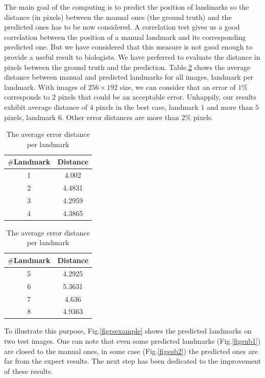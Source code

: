 \documentclass[10pt]{article}
\begin{document}
The main goal of the computing is to predict the position of landmarks so
the distance (in pixels) between the manual ones (the ground truth)
and the predicted ones has to be now considered. A correlation test
gives us a good correlation between the position of a manual landmark and
its corresponding predicted one. But we have considered that this
measure is not good enough to provide a useful result to biologists. We
have preferred to evaluate the distance in pixels between the ground
truth and the prediction. Table.\ref{tabledistance} shows the
average distance between manual and predicted landmarks for all
images, landmark per landmark. With images of $256 \times 192$ size, we
can consider that an error of $1\%$ corresponds to $2$ pixels that
could be an acceptable error. Unhappily, our results exhibit
average distance of $4$ pixels in the best case, landmark $1$ and more
than $5$ pixels, landmark $6$. Other error distances are more than $2\%$
pixels.


\begin{table}[h!]
	\begin{subtable}{.22\linewidth}
	\centering
	\begin{tabular}{|c|c| }
	\hline
	\textbf{$\#$Landmark} & \textbf{Distance} \\ \hline
	1 & 4.002  \\ \hline
	2 & 4.4831 \\ \hline
	3 & 4.2959 \\ \hline
	4 & 4.3865 \\ \hline
	
	\end{tabular}
	\end{subtable}%
	\hspace{2.5cm}
	\begin{subtable}{.2\linewidth}
	\centering
	\begin{tabular}{|c|c| }
	\hline
	\textbf{$\#$Landmark} & \textbf{Distance} \\ \hline
	5 & 4.2925 \\ \hline
	6 & 5.3631 \\ \hline
	7 & 4.636 \\ \hline
	8 & 4.9363 \\ \hline
	\end{tabular}
	\end{subtable}
	\caption{\small{The average error distance per landmark}}
	\label{tabledistance}
\end{table}

To illustrate this purpose, Fig.\ref{figrsexample} shows the predicted landmarks on two test images. One can note that even some predicted landmarks (Fig.\ref{figsub1})
are closed to the manual ones, in some case (Fig.\ref{figsub2}) the predicted
ones are far from the expect results. The next step has been dedicated
to the improvement of these results.
\end{document}
